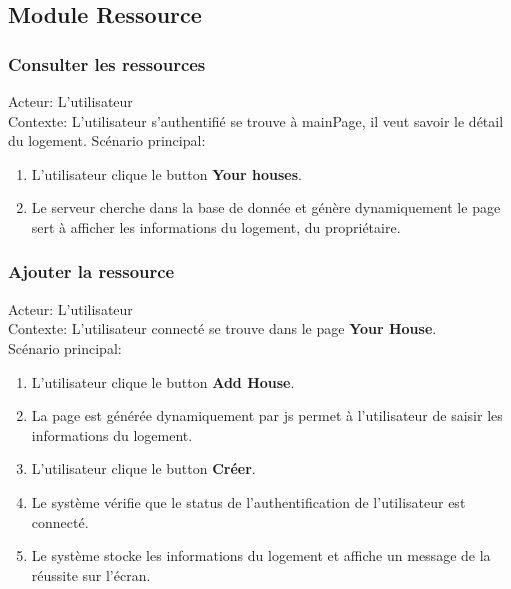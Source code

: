 \documentclass[14px]{article}
\begin{document}
\subsection{Module Ressource}
\subsubsection{Consulter les ressources}
Acteur: L'utilisateur\\
Contexte: L'utilisateur s'authentifié se trouve à mainPage, il veut savoir le détail du logement.
Scénario principal:
\begin{enumerate}
	\item L'utilisateur clique le button \textbf{Your houses}.
	\item Le serveur cherche dans la base de donnée et génère dynamiquement le page sert à afficher les informations du logement, du propriétaire.
\end{enumerate}

\subsubsection{Ajouter la ressource}
Acteur: L'utilisateur\\
Contexte: L'utilisateur connecté se trouve dans le page \textbf{Your House}.\\
Scénario principal:
\begin{enumerate}
	\item L'utilisateur clique le button \textbf{Add House}.
	\item La page est générée dynamiquement par js permet à l'utilisateur de saisir les informations du logement.
	\item L'utilisateur clique le button \textbf{Créer}.
	\item Le système vérifie que le status de l'authentification de l'utilisateur est connecté.
	\item Le système stocke les informations du logement et affiche un message de la réussite sur l'écran.
\end{enumerate}
\end{document}
